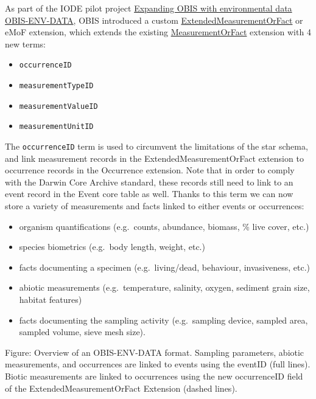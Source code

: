 \documentclass[
  letterpaper,
  DIV=11,
  numbers=noendperiod,
  oneside]{scrreprt}
\providecommand{\tightlist}{%
  \setlength{\itemsep}{0pt}\setlength{\parskip}{0pt}}\usepackage{longtable,booktabs,array}
\begin{document}
As part of the IODE pilot project
\href{https://www.iode.org/index.php?option=com_content\&view=article\&id=463\&Itemid=100200}{Expanding
OBIS with environmental data OBIS-ENV-DATA}, OBIS introduced a custom
\href{http://rs.gbif.org/extension/obis/extended_measurement_or_fact.xml}{ExtendedMeasurementOrFact}
or eMoF extension, which extends the existing
\href{http://rs.gbif.org/extension/dwc/measurements_or_facts.xml}{MeasurementOrFact}
extension with 4 new terms:

\begin{itemize}
\tightlist
\item
  \texttt{occurrenceID}
\item
  \texttt{measurementTypeID}
\item
  \texttt{measurementValueID}
\item
  \texttt{measurementUnitID}
\end{itemize}

The \texttt{occurrenceID} term is used to circumvent the limitations of
the star schema, and link measurement records in the
ExtendedMeasurementOrFact extension to occurrence records in the
Occurrence extension. Note that in order to comply with the Darwin Core
Archive standard, these records still need to link to an event record in
the Event core table as well. Thanks to this term we can now store a
variety of measurements and facts linked to either events or
occurrences:

\begin{itemize}
\tightlist
\item
  organism quantifications (e.g.~counts, abundance, biomass, \% live
  cover, etc.)
\item
  species biometrics (e.g.~body length, weight, etc.)
\item
  facts documenting a specimen (e.g.~living/dead, behaviour,
  invasiveness, etc.)
\item
  abiotic measurements (e.g.~temperature, salinity, oxygen, sediment
  grain size, habitat features)
\item
  facts documenting the sampling activity (e.g.~sampling device, sampled
  area, sampled volume, sieve mesh size).
\end{itemize}

Figure: Overview of an OBIS-ENV-DATA format. Sampling parameters,
abiotic measurements, and occurrences are linked to events using the
eventID (full lines). Biotic measurements are linked to occurrences
using the new occurrenceID field of the ExtendedMeasurementOrFact
Extension (dashed lines).
\end{document}
